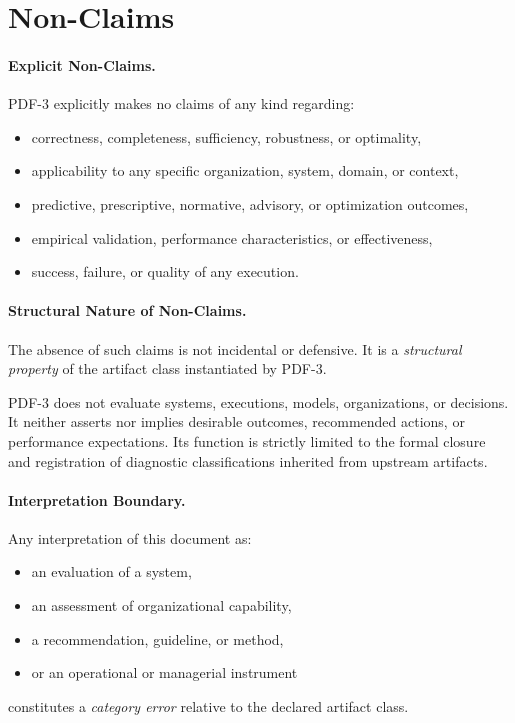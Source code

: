 ﻿\section{Non-Claims}

\paragraph{Explicit Non-Claims.}
PDF-3 explicitly makes no claims of any kind regarding:
\begin{itemize}
  \item correctness, completeness, sufficiency, robustness, or optimality,
  \item applicability to any specific organization, system, domain, or context,
  \item predictive, prescriptive, normative, advisory, or optimization outcomes,
  \item empirical validation, performance characteristics, or effectiveness,
  \item success, failure, or quality of any execution.
\end{itemize}

\paragraph{Structural Nature of Non-Claims.}
The absence of such claims is not incidental or defensive.
It is a \emph{structural property} of the artifact class instantiated by PDF-3.

PDF-3 does not evaluate systems, executions, models, organizations, or decisions.
It neither asserts nor implies desirable outcomes, recommended actions, or
performance expectations.
Its function is strictly limited to the formal closure and registration of
diagnostic classifications inherited from upstream artifacts.

\paragraph{Interpretation Boundary.}
Any interpretation of this document as:
\begin{itemize}
  \item an evaluation of a system,
  \item an assessment of organizational capability,
  \item a recommendation, guideline, or method,
  \item or an operational or managerial instrument
\end{itemize}
constitutes a \emph{category error} relative to the declared artifact class.

